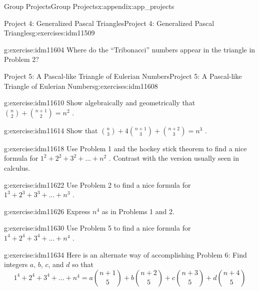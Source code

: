 \documentclass[oneside,10pt,]{book}
\numberwithin{equation}{chapter}
\begin{document}
\begin{appendixptx}{Group Projects}{}{Group Projects}{}{}{x:appendix:app_projects}
\begin{exercises-section-numberless}{Project 4: Generalized Pascal Triangles}{}{Project 4: Generalized Pascal Triangles}{}{}{g:exercises:idm11509}
\begin{divisionexercise}{8}{}{}{g:exercise:idm11604}%
Where do the ``Tribonacci'' numbers appear in the triangle in Problem 2?%
\end{divisionexercise}%
\end{exercises-section-numberless}
%
%
\typeout{************************************************}
\typeout{************************************************}
%
\begin{exercises-section-numberless}{Project 5: A Pascal-like Triangle of Eulerian Numbers}{}{Project 5: A Pascal-like Triangle of Eulerian Numbers}{}{}{g:exercises:idm11608}
\begin{divisionexercise}{1}{}{}{g:exercise:idm11610}%
Show algebraically and geometrically that \(\binom{n}{2}
+
\binom{n + 1}{2}
= n^{2}\) .%
\end{divisionexercise}%
\begin{divisionexercise}{2}{}{}{g:exercise:idm11614}%
Show that \(\binom{n}{3}
+ 4
\binom{n + 1}{3}
+
\binom{n + 2}{3}
= n^{3}\) .%
\end{divisionexercise}%
\begin{divisionexercise}{3}{}{}{g:exercise:idm11618}%
Use Problem 1 and the hockey stick theorem to find a nice formula for \(1^{2} + 2^{2} + 3^{2} + \ldots + n^{2}\) . Contrast with the version usually seen in calculus.%
\end{divisionexercise}%
\begin{divisionexercise}{4}{}{}{g:exercise:idm11622}%
Use Problem 2 to find a nice formula for \(1^{3} + 2^{3} + 3^{3} + \ldots + n^{3}\) .%
\end{divisionexercise}%
\begin{divisionexercise}{5}{}{}{g:exercise:idm11626}%
Express \(n^{4}\) as in Problems 1 and 2.%
\end{divisionexercise}%
\begin{divisionexercise}{6}{}{}{g:exercise:idm11630}%
Use Problem 5 to find a nice formula for \(1^{4} + 2^{4} + 3^{4} + \ldots + n^{4}\) .%
\end{divisionexercise}%
\begin{divisionexercise}{7}{}{}{g:exercise:idm11634}%
Here is an alternate way of accomplishing Problem 6:  Find integers \(a\), \(b\), \(c\), and \(d\) so that%
\begin{equation*}
1^{4} + 2^{4} + 3^{4} + \ldots + n^{4} = a\binom{n + 1}{5}  + b\binom{n + 2}{5}  + c\binom{n + 3}{5}  + d\binom{n + 4}{5}

\end{equation*}
\end{divisionexercise}
\end{exercises-section-numberless}
\end{appendixptx}
\end{document}
